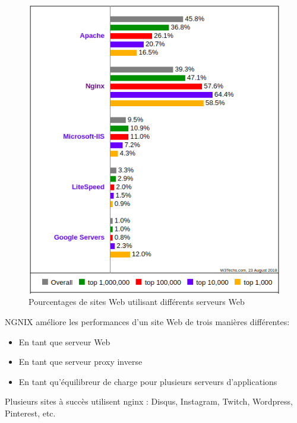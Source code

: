 \begin{enumerate}
		\begin{figure}[H]
		    \begin{center}
			\includegraphics[scale=0.5]{images/nginx-ranking.png}
		    \end{center}
		    \caption{Pourcentages de sites Web utilisant différents serveurs Web \cite{ranking}}
		    \label{Accueil}
		\end{figure}			  
		NGNIX améliore les performances d'un site Web de trois manières différentes:
		\begin{itemize}
		  \item En tant que serveur Web
		  \item En tant que serveur proxy inverse
		  \item En tant qu'équilibreur de charge pour plusieurs serveurs d'applications
		\end{itemize}
		Plusieurs sites \`a succ\`es utilisent nginx :  Disqus, Instagram, Twitch, Wordpress, Pinterest, etc.
		

\end{enumerate}
